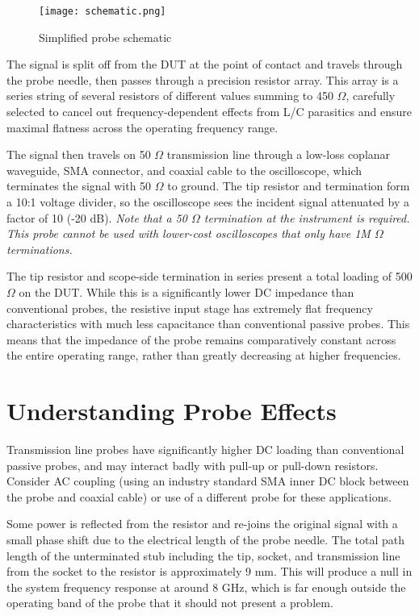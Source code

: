 \documentclass[11pt]{article}
\begin{document}
\begin{figure}[h]
\centering
\texttt{[image: schematic.png]}
\caption{Simplified probe schematic}
\label{schematic}
\end{figure}

The signal is split off from the DUT at the point of contact and travels through the probe needle, then passes through
a precision resistor array. This array is a series string of several resistors of different values summing to
450 $\Omega$, carefully selected to cancel out frequency-dependent effects from L/C parasitics and ensure maximal
flatness across the operating frequency range.

The signal then travels on 50 $\Omega$ transmission line through a low-loss coplanar waveguide, SMA connector, and
coaxial cable to the oscilloscope, which terminates the signal with 50 $\Omega$ to ground. The tip resistor and
termination form a 10:1 voltage divider, so the oscilloscope sees the incident signal attenuated by a factor of 10 (-20
dB). \emph{Note that a 50 $\Omega$ termination at the instrument is required. This probe cannot be used with lower-cost
oscilloscopes that only have 1M $\Omega$ terminations.}

The tip resistor and scope-side termination in series present a total loading of 500 $\Omega$ on the DUT. While this is
a significantly lower DC impedance than conventional probes, the resistive input stage has extremely flat frequency
characteristics with much less capacitance than conventional passive probes. This means that the impedance of the probe
remains comparatively constant across the entire operating range, rather than greatly decreasing at higher frequencies.

\section{Understanding Probe Effects}

Transmission line probes have significantly higher DC loading than conventional passive probes, and may interact badly
with pull-up or pull-down resistors. Consider AC coupling (using an industry standard SMA inner DC block between the
probe and coaxial cable) or use of a different probe for these applications.

Some power is reflected from the resistor and re-joins the original signal with a small phase shift due to the
electrical length of the probe needle. The total path length of the unterminated stub including the tip, socket, and
transmission line from the socket to the resistor is approximately 9 mm. This will produce a null in the system
frequency response at around 8 GHz, which is far enough outside the operating band of the probe that it should not
present a problem.
\end{document}
